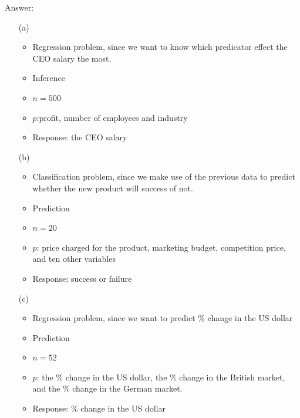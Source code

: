 \documentclass[12pt,a4paper]{article}%
\theoremstyle{definition}
\theoremstyle{plain}
\numberwithin{equation}{section}
\begin{document}
\begin{framed}
Answer:
    \begin{enumerate}
        \item[(a)]
            \begin{itemize}
                \item Regression problem, since we want to know which predicator effect the CEO salary the most.
                \item Inference
                \item $n=500$
                \item $p$:profit, number of employees and industry
                \item Response: the CEO salary
            \end{itemize}
        \item[(b)]
            \begin{itemize}
                \item Classification problem, since we make use of the previous data to predict whether the new product will success of not.
                \item Prediction
                \item $n=20$
                \item $p$: price charged for the product, marketing budget, competition price, and ten other variables
                \item Response: success or failure
            \end{itemize}
        \item[(c)]
            \begin{itemize}
                \item Regression problem, since we want to predict \% change in the US dollar
                \item Prediction
                \item $n=52$
                \item $p$: the \% change in the US dollar, the \% change in the British market, and the \% change in the German market.
                \item Response: \% change in the US dollar
            \end{itemize}
    \end{enumerate}
\end{framed}

\end{document}
